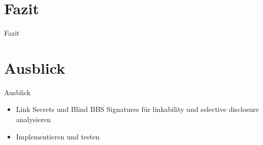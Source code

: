 \documentclass[
	german,%
	authorontitle=true,
	]{bfhbeamer}
\begin{document}

\section{Fazit}

\begin{frame}{Fazit}
\end{frame}

\section{Ausblick}

\begin{frame}{Ausblick}
    \begin{itemize}
        \item Link Secrets und Blind BBS Signatures für linkability und selective disclosure analysieren
        \item Implementieren und testen
    \end{itemize}
\end{frame}
\end{document}
